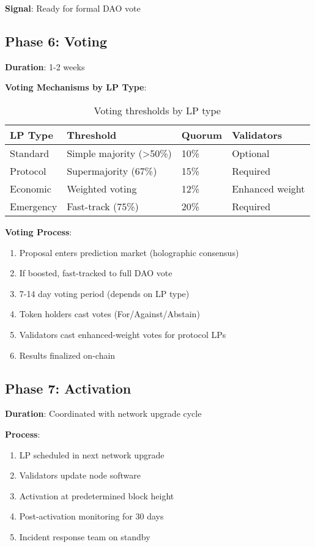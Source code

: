 \documentclass[11pt,a4paper]{article}
\begin{document}
\textbf{Signal}: Ready for formal DAO vote

\subsection{Phase 6: Voting}

\textbf{Duration}: 1-2 weeks

\textbf{Voting Mechanisms by LP Type}:

\begin{table}[h]
\centering
\begin{tabular}{@{}llll@{}}
\toprule
\textbf{LP Type} & \textbf{Threshold} & \textbf{Quorum} & \textbf{Validators} \\ \midrule
Standard & Simple majority (>50\%) & 10\% & Optional \\
Protocol & Supermajority (67\%) & 15\% & Required \\
Economic & Weighted voting & 12\% & Enhanced weight \\
Emergency & Fast-track (75\%) & 20\% & Required \\ \bottomrule
\end{tabular}
\caption{Voting thresholds by LP type}
\end{table}

\textbf{Voting Process}:
\begin{enumerate}
\item Proposal enters prediction market (holographic consensus)
\item If boosted, fast-tracked to full DAO vote
\item 7-14 day voting period (depends on LP type)
\item Token holders cast votes (For/Against/Abstain)
\item Validators cast enhanced-weight votes for protocol LPs
\item Results finalized on-chain
\end{enumerate}

\subsection{Phase 7: Activation}

\textbf{Duration}: Coordinated with network upgrade cycle

\textbf{Process}:
\begin{enumerate}
\item LP scheduled in next network upgrade
\item Validators update node software
\item Activation at predetermined block height
\item Post-activation monitoring for 30 days
\item Incident response team on standby
\end{enumerate}
\end{document}
